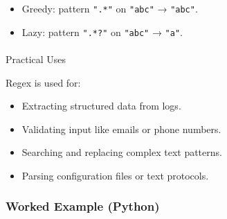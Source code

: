 \documentclass[
  letterpaper,
  DIV=11,
  numbers=noendperiod]{scrreprt}
\makeatletter
\let\oldparagraph\paragraph
\renewcommand{\paragraph}{
    \@ifstar
      \xxxParagraphStar
      \xxxParagraphNoStar
  }
\newcommand{\xxxParagraphStar}[1]{\oldparagraph*{#1}\mbox{}}
\newcommand{\xxxParagraphNoStar}[1]{\oldparagraph{#1}\mbox{}}
\providecommand{\tightlist}{%
  \setlength{\itemsep}{0pt}\setlength{\parskip}{0pt}}
\makeatother
\begin{document}
\begin{itemize}
\tightlist
\item
  Greedy: pattern \texttt{".*"} on \texttt{"abc"} → \texttt{"abc"}.
\item
  Lazy: pattern \texttt{".*?"} on \texttt{"abc"} → \texttt{"a"}.
\end{itemize}

\paragraph{Practical Uses}\label{practical-uses}

Regex is used for:

\begin{itemize}
\tightlist
\item
  Extracting structured data from logs.
\item
  Validating input like emails or phone numbers.
\item
  Searching and replacing complex text patterns.
\item
  Parsing configuration files or text protocols.
\end{itemize}

\subsubsection{Worked Example (Python)}\label{worked-example-python-14}
\end{document}
